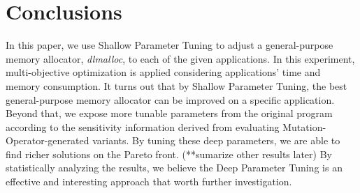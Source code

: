 \section{Conclusions}
In this paper, we use Shallow Parameter Tuning to adjust a general-purpose memory allocator, \emph{dlmalloc}, to each of the given applications. In this experiment, multi-objective optimization is applied considering applications' time and memory consumption. It turns out that by Shallow Parameter Tuning, the best general-purpose memory allocator can be improved on a specific application. Beyond that, we expose more tunable parameters from the original program according to the sensitivity information derived from evaluating Mutation-Operator-generated variants. By tuning these deep parameters, we are able to find richer solutions on the Pareto front. (**sumarize other results later) By statistically analyzing the results, we believe the Deep Parameter Tuning is an effective and interesting approach that worth further investigation.
